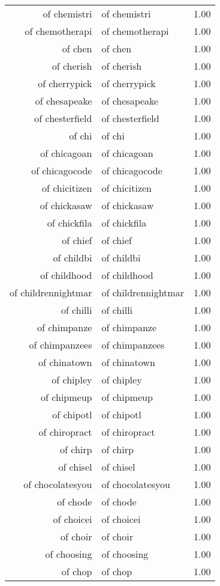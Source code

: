 \begin{table}[ht]
\begin{tabular}{rlr}
  of chemistri & of chemistri & 1.00 \\ 
  of chemotherapi & of chemotherapi & 1.00 \\ 
  of chen & of chen & 1.00 \\ 
  of cherish & of cherish & 1.00 \\ 
  of cherrypick & of cherrypick & 1.00 \\ 
  of chesapeake & of chesapeake & 1.00 \\ 
  of chesterfield & of chesterfield & 1.00 \\ 
  of chi & of chi & 1.00 \\ 
  of chicagoan & of chicagoan & 1.00 \\ 
  of chicagocode & of chicagocode & 1.00 \\ 
  of chicitizen & of chicitizen & 1.00 \\ 
  of chickasaw & of chickasaw & 1.00 \\ 
  of chickfila & of chickfila & 1.00 \\ 
  of chief & of chief & 1.00 \\ 
  of childbi & of childbi & 1.00 \\ 
  of childhood & of childhood & 1.00 \\ 
  of childrennightmar & of childrennightmar & 1.00 \\ 
  of chilli & of chilli & 1.00 \\ 
  of chimpanze & of chimpanze & 1.00 \\ 
  of chimpanzees & of chimpanzees & 1.00 \\ 
  of chinatown & of chinatown & 1.00 \\ 
  of chipley & of chipley & 1.00 \\ 
  of chipmeup & of chipmeup & 1.00 \\ 
  of chipotl & of chipotl & 1.00 \\ 
  of chiropract & of chiropract & 1.00 \\ 
  of chirp & of chirp & 1.00 \\ 
  of chisel & of chisel & 1.00 \\ 
  of chocolatesyou & of chocolatesyou & 1.00 \\ 
  of chode & of chode & 1.00 \\ 
  of choicei & of choicei & 1.00 \\ 
  of choir & of choir & 1.00 \\ 
  of choosing & of choosing & 1.00 \\ 
  of chop & of chop & 1.00 \\ 

\end{tabular}
\end{table}
